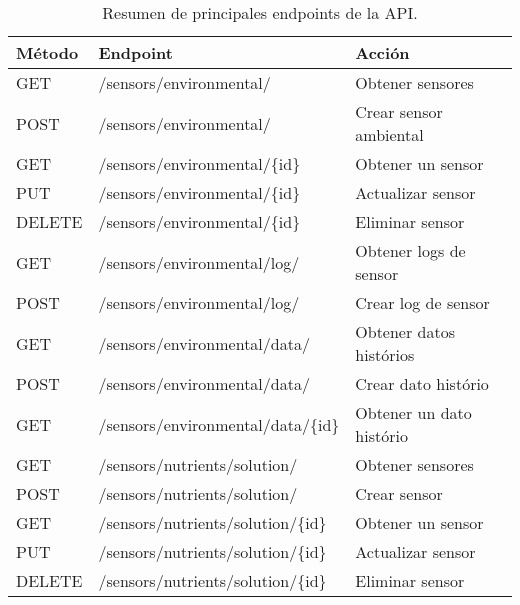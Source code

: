 \begin{table}[H]
    \centering
    \caption[Resumen de principales endpoints de la API.]{Resumen de principales endpoints de la API.}
    \begin{tabular}{l l l}
        \toprule
        \textbf{Método} & \textbf{Endpoint}                       & \textbf{Acción}          \\
        \midrule
        GET             & /sensors/environmental/                 & Obtener sensores         \\
        POST            & /sensors/environmental/                 & Crear sensor ambiental   \\
        GET             & /sensors/environmental/\{id\}           & Obtener un sensor        \\
        PUT             & /sensors/environmental/\{id\}           & Actualizar sensor        \\
        DELETE          & /sensors/environmental/\{id\}           & Eliminar sensor          \\
        \midrule
        GET             & /sensors/environmental/log/             & Obtener logs de sensor   \\
        POST            & /sensors/environmental/log/             & Crear log de sensor      \\
        \midrule
        GET             & /sensors/environmental/data/            & Obtener datos histórios  \\
        POST            & /sensors/environmental/data/            & Crear dato histório      \\
        GET             & /sensors/environmental/data/\{id\}      & Obtener un dato histório \\
        \midrule
        GET             & /sensors/nutrients/solution/            & Obtener sensores         \\
        POST            & /sensors/nutrients/solution/            & Crear sensor             \\
        GET             & /sensors/nutrients/solution/\{id\}      & Obtener un sensor        \\
        PUT             & /sensors/nutrients/solution/\{id\}      & Actualizar sensor        \\
        DELETE          & /sensors/nutrients/solution/\{id\}      & Eliminar sensor          \\
        \midrule

\end{tabular}
\end{table}
